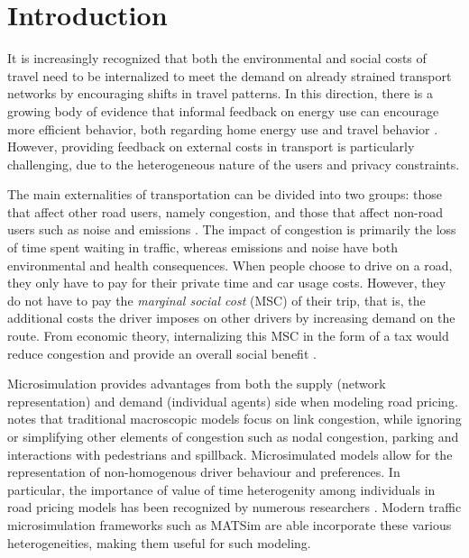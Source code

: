 \section{Introduction}

It is increasingly recognized that both the environmental and social costs of travel need to be internalized to meet the demand on already strained transport networks by encouraging shifts in travel patterns.
In this direction, there is a growing body of evidence that informal feedback on energy use can encourage more efficient behavior, both regarding home energy use \citep{faruqui2010impact} and travel behavior \citep{taniguchi2003psychological, fujii2006determinants}.
However, providing feedback on external costs in transport is particularly challenging, due to the heterogeneous nature of the users and privacy constraints.

The main externalities of transportation can be divided into two groups: those that affect other road users, namely congestion, and those that affect non-road users such as noise and emissions \citep{button2004rationale}.
The impact of congestion is primarily the loss of time spent waiting in traffic, whereas emissions and noise have both environmental and health consequences.
When people choose to drive on a road, they only have to pay for their private time and car usage costs.
However, they do not have to pay the \textit{marginal social cost} (MSC) of their trip, that is, the additional costs the driver imposes on other drivers by increasing demand on the route.
From economic theory, internalizing this MSC in the form of a tax would reduce congestion and provide an overall social benefit \citep{arnott1994economics, pigou2013economics}.

Microsimulation provides advantages from both the supply (network representation) and demand (individual agents) side when modeling road pricing.
\citet{arnott2001economic} notes that traditional macroscopic models focus on link congestion, while ignoring or simplifying other elements of congestion such as nodal congestion, parking and interactions with pedestrians and spillback.
Microsimulated models allow for the representation of non-homogenous driver behaviour and preferences.
In particular, the importance of value of time heterogenity among individuals in road pricing models has been recognized by numerous researchers \citep{small2001value, verhoef2004product}.
Modern traffic microsimulation frameworks such as MATSim \citep{balmer2009matsim} are able incorporate these various heterogeneities, making them useful for such modeling.

